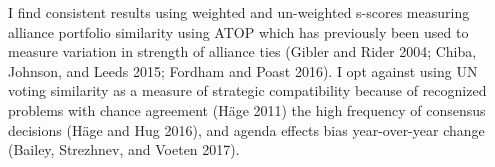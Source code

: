 \documentclass[
  letterpaper,
  DIV=11,
  numbers=noendperiod]{scrartcl}
\begin{document}
I find consistent results using weighted and un-weighted s-scores
measuring alliance portfolio similarity using ATOP which has previously
been used to measure variation in strength of alliance ties (Gibler and
Rider 2004; Chiba, Johnson, and Leeds 2015; Fordham and Poast 2016). I
opt against using UN voting similarity as a measure of strategic
compatibility because of recognized problems with chance agreement (Häge
2011) the high frequency of consensus decisions (Häge and Hug 2016), and
agenda effects bias year-over-year change (Bailey, Strezhnev, and Voeten
2017).

\begin{table}

\caption{\label{tbl-altstrcomp}Coefficient estimates with alternate
variables for strategic compatibility.}

\centering{

}
\end{table}
\end{document}

